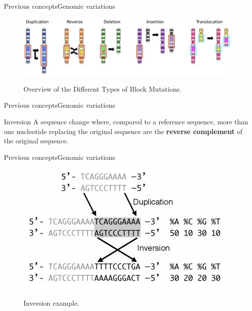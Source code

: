 \documentclass[10pt]{beamer}
\begin{document}
{%
\begin{frame}{Previous concepts}{Genomic variations}
	\begin{figure}[]
		\centering
		\includegraphics[width=\textwidth,height=0.7\textheight,keepaspectratio]{img/alignment/block_mutations_med.jpg}
		\label{img:alig}
		\caption{Overview of the Different Types of Block Mutations.}
	\end{figure}
\end{frame}

\begin{frame}{Previous concepts}{Genomic variations}
\begin{block}{Inversion}
	A sequence change where, compared to a reference sequence, more than one nucleotide replacing the original sequence are the \textbf{reverse complement} of the original sequence.	
\end{block}
\end{frame}

\begin{frame}{Previous concepts}{Genomic variations}
	\begin{figure}[]
		\centering
		\includegraphics[width=\textwidth,height=0.5\textheight,keepaspectratio]{img/alignment/inv1.jpg}
		\label{img:alig}
		\caption{Inversion example.}
	\end{figure}
\end{frame}


}
\end{document}
